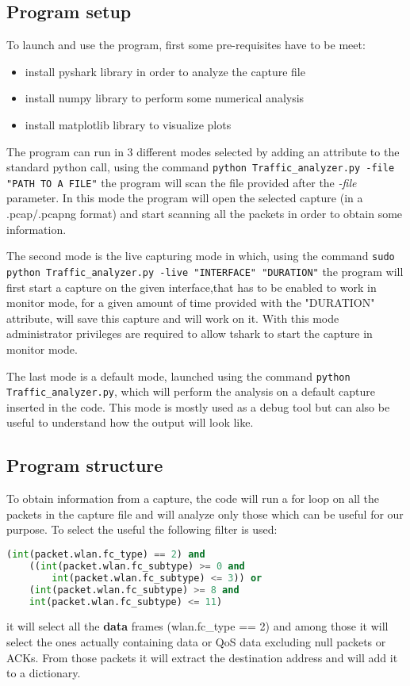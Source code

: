 \subsection{Program setup}
To launch and use the program, first some pre-requisites have to be meet:
\begin{itemize}
    \item install pyshark library in order to analyze the capture file 
    \item install numpy library to perform some numerical analysis
    \item install matplotlib library to visualize plots
\end{itemize}
The program can run in 3 different modes selected by adding an attribute to the standard 
python call, using the command \texttt{python Traffic\_analyzer.py -file "PATH TO A FILE"} 
the program will scan the file provided after the \textit{-file} parameter. In this mode the program
will open the selected capture (in a .pcap/.pcapng format) and start scanning all the packets in 
order to obtain some information. 

The second mode is the live capturing mode in which, using the command \texttt{sudo python
Traffic\_analyzer.py -live "INTERFACE" "DURATION"} the program will first start a 
capture on the given interface,that has to be enabled to work in monitor mode, for a given 
amount of time provided with the "DURATION" attribute, will save this capture and will work
on it. With this mode administrator privileges are required to allow tshark to start the 
capture in monitor mode.  

The last mode is a default mode, launched using the command \texttt{python Traffic\_analyzer.py},
which will perform the analysis on a default capture inserted in the code. This mode is mostly 
used as a debug tool but can also be useful to understand how the output will look like.

\subsection{Program structure}
To obtain information from a capture, the code will run a for loop on all the packets in the 
capture file and will analyze only those which can be useful for our purpose. To select the 
useful the following filter is used:

\begin{lstlisting}[language=Python, caption=Packet filter]
    (int(packet.wlan.fc_type) == 2) and 
    ((int(packet.wlan.fc_subtype) >= 0 and 
        int(packet.wlan.fc_subtype) <= 3)) or
    (int(packet.wlan.fc_subtype) >= 8 and 
    int(packet.wlan.fc_subtype) <= 11)
\end{lstlisting}

it will select all the \textbf{data} frames (wlan.fc\_type == 2) and among those it will 
select the ones actually containing data or QoS data excluding null packets or ACKs. From 
those packets it will extract the destination address and will add it to a dictionary. 